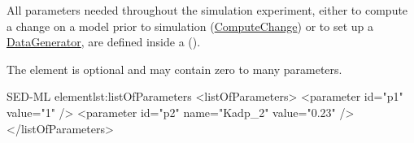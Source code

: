 \label{sec:listOfParameters}
All parameters needed throughout the simulation experiment, either to compute a change on a model prior to simulation (\hyperref[class:computeChange]{ComputeChange}) or to set up a \hyperref[class:dataGenerator]{DataGenerator},  are defined inside a  ().
%

The element is optional and may contain zero to many parameters.
%
\begin{myXmlLst}{SED-ML  element}{lst:listOfParameters}
<listOfParameters>
 <parameter id="p1" value="1" />
 <parameter id="p2" name="Kadp_2" value="0.23" />
</listOfParameters>
\end{myXmlLst}
%


